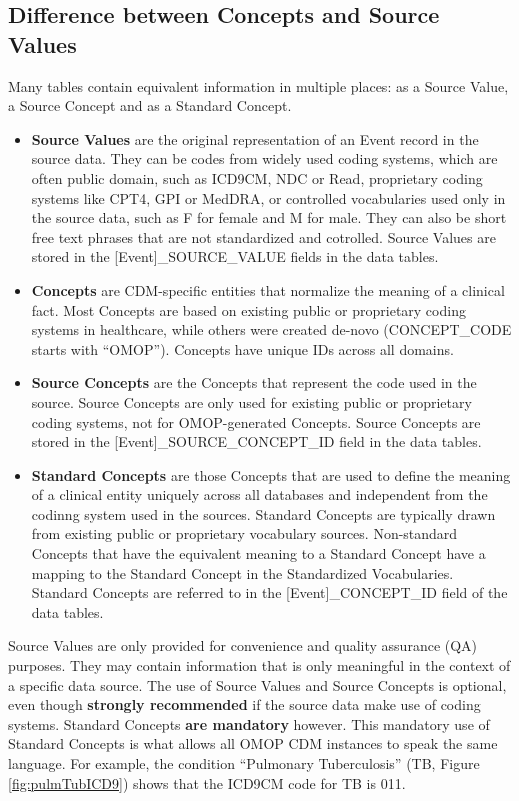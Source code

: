 \documentclass[11pt]{book}
\providecommand{\tightlist}{%
  \setlength{\itemsep}{0pt}\setlength{\parskip}{0pt}}
\theoremstyle{definition}
\theoremstyle{definition}
\theoremstyle{definition}
\theoremstyle{remark}
\begin{document}
\hypertarget{concepts-sources}{%
\subsection{Difference between Concepts and Source Values}\label{concepts-sources}}

Many tables contain equivalent information in multiple places: as a Source Value, a Source Concept and as a Standard Concept.

\begin{itemize}
\tightlist
\item
  \textbf{Source Values} are the original representation of an Event record in the source data. They can be codes from widely used coding systems, which are often public domain, such as ICD9CM, NDC or Read, proprietary coding systems like CPT4, GPI or MedDRA, or controlled vocabularies used only in the source data, such as F for female and M for male. They can also be short free text phrases that are not standardized and cotrolled. Source Values are stored in the {[}Event{]}\_SOURCE\_VALUE fields in the data tables.
\item
  \textbf{Concepts} are CDM-specific entities that normalize the meaning of a clinical fact. Most Concepts are based on existing public or proprietary coding systems in healthcare, while others were created de-novo (CONCEPT\_CODE starts with ``OMOP''). Concepts have unique IDs across all domains.
\item
  \textbf{Source Concepts} are the Concepts that represent the code used in the source. Source Concepts are only used for existing public or proprietary coding systems, not for OMOP-generated Concepts. Source Concepts are stored in the {[}Event{]}\_SOURCE\_CONCEPT\_ID field in the data tables.
\item
  \textbf{Standard Concepts} are those Concepts that are used to define the meaning of a clinical entity uniquely across all databases and independent from the codinng system used in the sources. Standard Concepts are typically drawn from existing public or proprietary vocabulary sources. Non-standard Concepts that have the equivalent meaning to a Standard Concept have a mapping to the Standard Concept in the Standardized Vocabularies. Standard Concepts are referred to in the {[}Event{]}\_CONCEPT\_ID field of the data tables.
\end{itemize}

Source Values are only provided for convenience and quality assurance (QA) purposes. They may contain information that is only meaningful in the context of a specific data source. The use of Source Values and Source Concepts is optional, even though \textbf{strongly recommended} if the source data make use of coding systems. Standard Concepts \textbf{are mandatory} however. This mandatory use of Standard Concepts is what allows all OMOP CDM instances to speak the same language. For example, the condition ``Pulmonary Tuberculosis'' (TB, Figure \ref{fig:pulmTubICD9}) shows that the ICD9CM code for TB is 011.
\end{document}
